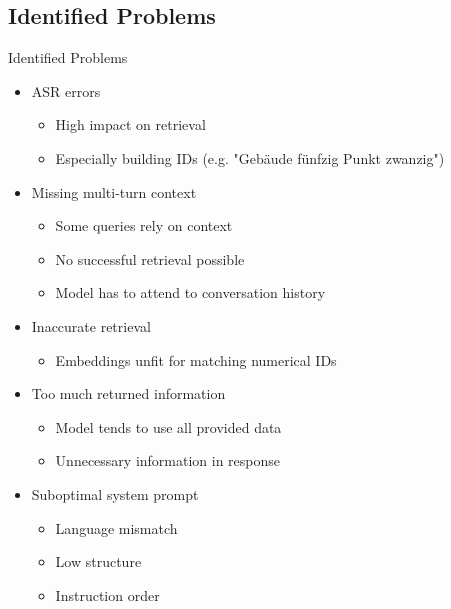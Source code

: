\documentclass{sdqbeamer}[smallfoot]
\begin{document}
\subsection{Identified Problems}
\begin{frame}{Identified Problems}
    \begin{itemize}
        \item ASR errors
            \begin{itemize}
                \item High impact on retrieval
                \item Especially building IDs (e.g. "Gebäude fünfzig Punkt zwanzig")
            \end{itemize}
        \item Missing multi-turn context
            \begin{itemize}
                \item Some queries rely on context
                \item No successful retrieval possible
                \item Model has to attend to conversation history
            \end{itemize}
        \item Inaccurate retrieval
            \begin{itemize}
                \item Embeddings unfit for matching numerical IDs
            \end{itemize}
        \item Too much returned information
            \begin{itemize}
                \item Model tends to use all provided data
                \item Unnecessary information in response
            \end{itemize}
        \item Suboptimal system prompt
            \begin{itemize}
                \item Language mismatch
                \item Low structure
                \item Instruction order
            \end{itemize}
    \end{itemize}
\end{frame}
\end{document}
